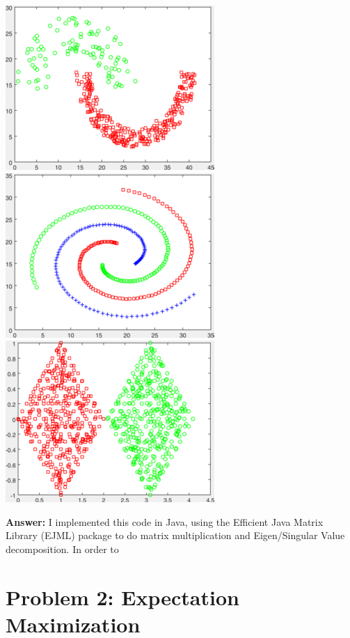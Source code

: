 \documentclass[11pt]{article}
\begin{document}
\begin{center}
\includegraphics[scale=0.5]{jain}
\includegraphics[scale=0.5]{spiral}
\includegraphics[scale=0.5]{twoDiamonds}
\end{center}
{\bf Answer:} 
I implemented this code in Java, using the Efficient Java Matrix Library (EJML) package to do matrix multiplication and Eigen/Singular Value decomposition. In order to 

\pagebreak
\section*{Problem 2: Expectation Maximization}
\end{document}
